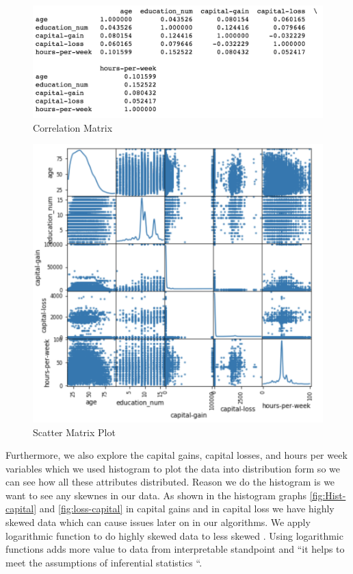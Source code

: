 \documentclass[sigconf]{acmart}
\begin{document}
 \begin{figure}[!ht]
  \centering
      \includegraphics[width=\columnwidth]{project/images/scatter.png}
  \caption{Correlation Matrix \cite{}}\label{fig:scatter-matrix}
\end{figure}

 \begin{figure}[!ht]
  \centering
      \includegraphics[width=\columnwidth]{project/images/scatter-matrix.png}
  \caption{Scatter Matrix Plot \cite{}}\label{fig:scatter}
\end{figure}

\par Furthermore, we also explore the capital gains, capital losses, and hours per week variables which we used histogram to plot the data into distribution form so we can see how all these attributes distributed. Reason we do the histogram is we want to see any skewnes in our data. As shown in the histogram graphs \ref{fig:Hist-capital} and  \ref{fig:loss-capital} in capital gains and in capital loss we have highly skewed data  which can cause issues later on in our algorithms. We apply logarithmic function to do highly skewed data to less skewed \cite{www-onlinestat}. Using logarithmic functions adds more value to data from interpretable standpoint and ``it helps to meet the assumptions of inferential statistics \cite{www-onlinestat}``.
\end{document}
